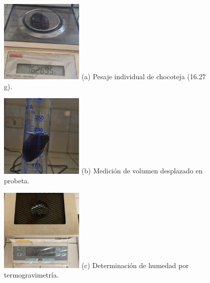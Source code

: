\documentclass[manuscript,screen,review]{acmart}
\begin{document}
\begin{figure}[H]
  \centering
  \begin{minipage}{0.26\linewidth}
    \centering
    \includegraphics[width=4cm,height=4cm,keepaspectratio]{imagen/resultados/densidad-re.jpeg}
    \small (a) Pesaje individual de chocoteja (16.27 g).
  \end{minipage}\hfill
  \begin{minipage}{0.26\linewidth}
    \centering
    \includegraphics[width=4cm,height=4cm,keepaspectratio]{imagen/resultados/densidad-re-2.jpeg}
    \small (b) Medición de volumen desplazado en probeta.
  \end{minipage}\hfill
  \begin{minipage}{0.26\linewidth}
    \centering
    \includegraphics[width=4cm,height=4cm,keepaspectratio]{imagen/resultados/Humedad-re.jpeg}
    \small (c) Determinación de humedad por termogravimetría.
  \end{minipage}
  \\[1.5ex]
  \begin{minipage}{0.26\linewidth}
    \centering

\end{minipage}
\end{figure}
\end{document}
